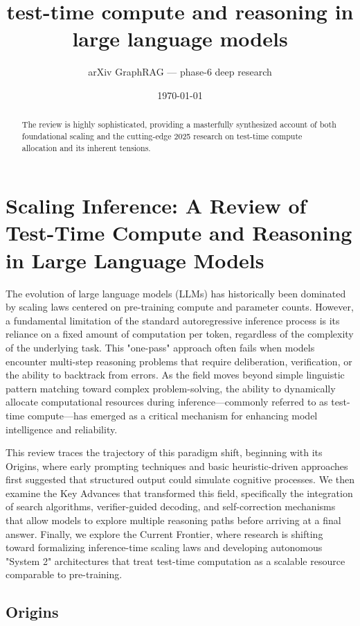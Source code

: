\documentclass[11pt]{article}
\title{test-time compute and reasoning in large language models}
\author{arXiv GraphRAG --- phase-6 deep research}
\date{\today}
\begin{document}
\maketitle

\begin{abstract}
The review is highly sophisticated, providing a masterfully synthesized account of both foundational scaling and the cutting-edge 2025 research on test-time compute allocation and its inherent tensions.
\end{abstract}

\section{Scaling Inference: A Review of Test-Time Compute and Reasoning in Large Language Models}

The evolution of large language models (LLMs) has historically been dominated by scaling laws centered on pre-training compute and parameter counts. However, a fundamental limitation of the standard autoregressive inference process is its reliance on a fixed amount of computation per token, regardless of the complexity of the underlying task. This "one-pass" approach often fails when models encounter multi-step reasoning problems that require deliberation, verification, or the ability to backtrack from errors. As the field moves beyond simple linguistic pattern matching toward complex problem-solving, the ability to dynamically allocate computational resources during inference—commonly referred to as test-time compute—has emerged as a critical mechanism for enhancing model intelligence and reliability.

This review traces the trajectory of this paradigm shift, beginning with its Origins, where early prompting techniques and basic heuristic-driven approaches first suggested that structured output could simulate cognitive processes. We then examine the Key Advances that transformed this field, specifically the integration of search algorithms, verifier-guided decoding, and self-correction mechanisms that allow models to explore multiple reasoning paths before arriving at a final answer. Finally, we explore the Current Frontier, where research is shifting toward formalizing inference-time scaling laws and developing autonomous "System 2" architectures that treat test-time computation as a scalable resource comparable to pre-training.

\subsection{Origins}
\end{document}
